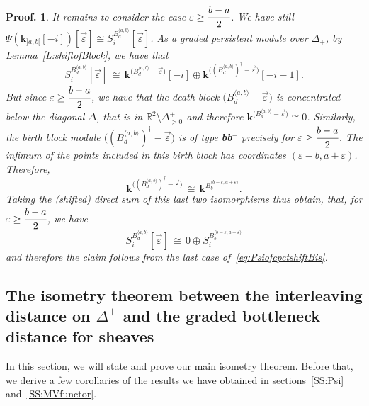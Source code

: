 \documentclass[a4paper, english, 11pt]{article}
\newcommand{\kk}[0]{\textbf{k}}
\newcommand{\0}{\vec{0}}
\newtheorem*{pf}{Proof.} }
\begin{document}
\begin{pf}
\smallskip

It remains to consider the case  $\varepsilon \geq \cfrac{b-a}{2}$. We have still $\Psi(\kk_{]a,b[}[-i]) [\vec{\varepsilon}] \cong S_i^{B_{d}^{\langle a, b \rangle}} [\vec{\varepsilon}]$. As a graded persistent module over $\Delta_+$, by Lemma~\ref{L:shiftofBlock}, we have  
 that
$$S_i^{B_{d}^{\langle a, b \rangle}} [\vec{\varepsilon}] \,\cong\, \kk^{\big(B_{d}^{\langle a, b \rangle} -\vec{\varepsilon}\big)} [-i] \oplus \kk^{\big((B_{d}^{\langle a, b\rangle})^\dagger -\vec{\varepsilon}\big)} [-i-1].$$ 
But since  $\varepsilon \geq \cfrac{b-a}{2}$, we have that the death block  $\big(B_{d}^{\langle a, b \rangle} -\vec{\varepsilon}\big)$ is concentrated below the diagonal $\Delta$, that is in $\mathbb{R}^2\setminus \Delta^+_{>0}$ and therefore $ \kk^{\big(B_{d}^{\langle a, b \rangle} -\vec{\varepsilon}\big)}\cong 0$.  Similarly, the birth block module  
$\big((B_{d}^{\langle a, b\rangle})^\dagger -\vec{\varepsilon}\big)$ is of type \textbf{bb}$^{-}$ precisely for $\varepsilon \geq \cfrac{b-a}{2}$. The infimum of the points included in this birth block has coordinates $(\varepsilon -b, a+\varepsilon)$. Therefore, 
$$\kk^{\big((B_{d}^{\langle a, b\rangle})^\dagger -\vec{\varepsilon}\big)} \, \cong \, \kk^{B_{b}^{\langle b-\varepsilon, a+\varepsilon \rangle}}.$$
Taking the (shifted) direct sum of this last two isomorphisms thus obtain, that, for $\varepsilon \geq \cfrac{b-a}{2}$, we have  
$$ S_i^{B_{d}^{\langle a, b \rangle}} [\vec{\varepsilon}] \,\cong\, 0 \oplus S_i^{B_{b}^{\langle b-\varepsilon, a+\varepsilon \rangle}}$$
and therefore the claim follows from the last case of~\eqref{eq:PsiofcpctshiftBis}.
\end{pf}

\subsection{The isometry theorem between the interleaving distance on $\Delta^+$ and the graded bottleneck distance for sheaves} 
In this section, we will state and prove our main isometry theorem. 
Before that, we derive a few corollaries of the results we have obtained in sections~\ref{SS:Psi} and~\ref{SS:MVfunctor}.

\smallskip
\end{document}
